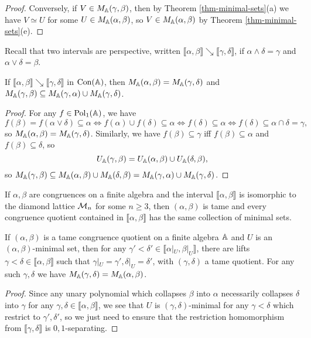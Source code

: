 \begin{appendices}
\begin{proof}
Conversely, if $V \in M_{\mathbb{A}}(\gamma,\beta)$, then by Theorem \ref{thm-minimal-sets}(a) we have $V \simeq U$ for some $U \in M_{\mathbb{A}}(\alpha,\beta)$, so $V \in M_{\mathbb{A}}(\alpha,\beta)$ by Theorem \ref{thm-minimal-sets}(e).
\end{proof}

Recall that two intervals are perspective, written $\llbracket \alpha, \beta \rrbracket \searrow \llbracket \gamma, \delta \rrbracket$, if $\alpha \wedge \delta = \gamma$ and $\alpha \vee \delta = \beta$.

\begin{prop}\label{prop-minimal-sets-perspective} If $\llbracket \alpha, \beta \rrbracket \searrow \llbracket \gamma, \delta \rrbracket$ in $\operatorname{Con}(\mathbb{A})$, then $M_{\mathbb{A}}(\alpha,\beta) = M_{\mathbb{A}}(\gamma,\delta)$ and $M_{\mathbb{A}}(\gamma,\beta) \subseteq M_{\mathbb{A}}(\gamma,\alpha) \cup M_{\mathbb{A}}(\gamma, \delta)$.
\end{prop}
\begin{proof} For any $f \in \operatorname{Pol}_1(\mathbb{A})$, we have
\[
f(\beta) = f(\alpha \vee \delta) \subseteq \alpha \iff f(\alpha) \cup f(\delta) \subseteq \alpha \iff f(\delta) \subseteq \alpha \iff f(\delta) \subseteq \alpha \cap \delta = \gamma,
\]
so $M_{\mathbb{A}}(\alpha,\beta) = M_{\mathbb{A}}(\gamma,\delta)$. Similarly, we have $f(\beta) \subseteq \gamma$ iff $f(\beta) \subseteq \alpha$ and $f(\beta) \subseteq \delta$, so
\[
U_{\mathbb{A}}(\gamma,\beta) = U_{\mathbb{A}}(\alpha,\beta) \cup U_{\mathbb{A}}(\delta,\beta),
\]
so $M_{\mathbb{A}}(\gamma,\beta) \subseteq M_{\mathbb{A}}(\alpha,\beta) \cup M_{\mathbb{A}}(\delta,\beta) = M_{\mathbb{A}}(\gamma,\alpha) \cup M_{\mathbb{A}}(\gamma, \delta)$.
\end{proof}

\begin{cor} If $\alpha,\beta$ are congruences on a finite algebra and the interval $\llbracket \alpha, \beta \rrbracket$ is isomorphic to the diamond lattice $\mathcal{M}_n$ for some $n \ge 3$, then $(\alpha, \beta)$ is tame and every congruence quotient contained in $\llbracket \alpha, \beta \rrbracket$ has the same collection of minimal sets.
\end{cor}

\begin{prop} If $(\alpha,\beta)$ is a tame congruence quotient on a finite algebra $\mathbb{A}$ and $U$ is an $(\alpha,\beta)$-minimal set, then for any $\gamma' < \delta' \in \llbracket \alpha|_U ,\beta|_U \rrbracket$, there are lifts $\gamma < \delta \in \llbracket \alpha, \beta \rrbracket$ such that $\gamma|_U = \gamma', \delta|_U = \delta'$, with $(\gamma,\delta)$ a tame quotient. For any such $\gamma, \delta$ we have $M_{\mathbb{A}}(\gamma,\delta) = M_{\mathbb{A}}(\alpha,\beta)$.
\end{prop}
\begin{proof} Since any unary polynomial which collapses $\beta$ into $\alpha$ necessarily collapses $\delta$ into $\gamma$ for any $\gamma,\delta \in \llbracket \alpha, \beta \rrbracket$, we see that $U$ is $(\gamma,\delta)$-minimal for any $\gamma < \delta$ which restrict to $\gamma', \delta'$, so we just need to ensure that the restriction homomorphism from $\llbracket \gamma, \delta \rrbracket$ is $0,1$-separating.


\end{proof}
\end{appendices}
